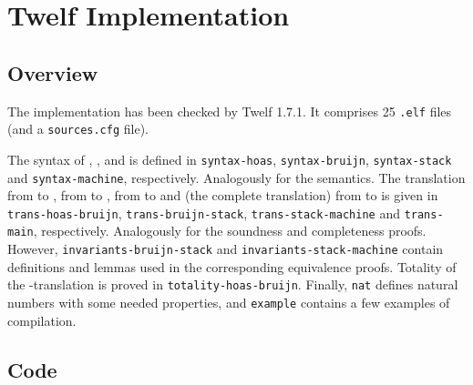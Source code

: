 \appendix

\section{Twelf Implementation}
\label{sec:code}

\subsection{Overview}

The implementation has been checked by Twelf 1.7.1.
It comprises 25 \texttt{.elf} files (and a \texttt{sources.cfg} file).

The syntax of \hlang, \blang, \slang and \mlang is defined in \texttt{syntax-hoas}, \texttt{syntax-bruijn}, \texttt{syntax-stack} and \texttt{syntax-machine}, respectively.
Analogously for the semantics.
The translation from \hlang to \blang, from \blang to \slang, from \slang to \mlang and (the complete translation) from \hlang to \mlang is given in \texttt{trans-hoas-bruijn}, \texttt{trans-bruijn-stack}, \texttt{trans-stack-machine} and \texttt{trans-main}, respectively.
Analogously for the soundness and completeness proofs.
However, \texttt{invariants-bruijn-stack} and \texttt{invariants-stack-machine} contain definitions and lemmas used in the corresponding equivalence proofs.
Totality of the \hlang-\blang translation is proved in \texttt{totality-hoas-bruijn}.
Finally, \texttt{nat} defines natural numbers with some needed properties, and \texttt{example} contains a few examples of compilation.

\subsection{Code}
\begingroup
\makeatletter
\@totalleftmargin=-2.5cm

\endgroup
